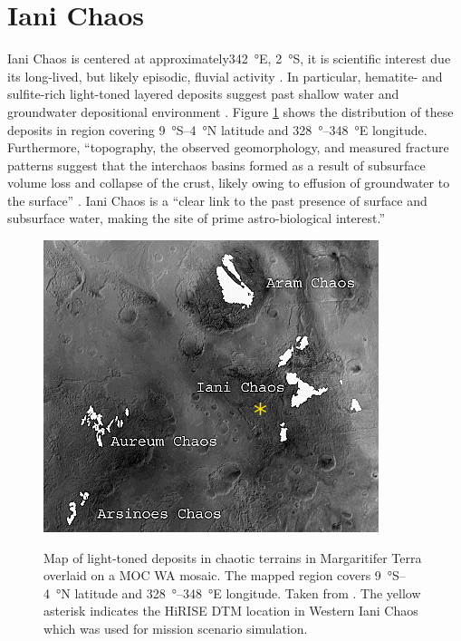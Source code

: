 \section{Iani Chaos}
\label{sec:MissionSites:IaniChaos}
Iani Chaos is centered at approximately\SI{342}{\degree}E, \SI{2}{\degree}S, it is scientific interest due its long-lived, but likely episodic, fluvial activity . In particular, hematite- and sulfite-rich light-toned layered deposits suggest past shallow water and groundwater depositional environment . Figure \ref{fig:mission-site-iani-chaos} shows the distribution of these deposits in region covering \SI{9}{\degree}S–\SI{4}{\degree}N latitude and \SI{328}{\degree}–\SI{348}{\degree}E longitude. Furthermore, ``topography, the observed geomorphology, and measured fracture patterns suggest that the interchaos basins formed as a result of subsurface volume loss and collapse of the crust, likely owing to effusion of groundwater to the surface'' . Iani Chaos is a ``clear link to the past presence of surface and subsurface water, making the site of prime astro-biological interest.'' 

\begin{figure}[h]
  \centering
  \hypersetup{linkcolor=captionTextColor}
  \includegraphics[width=0.5\linewidth]{sections/mission-sites/images/iani-chaos-deposits.png}\\
  \caption[Map of light‐toned deposits in chaotic terrains in Margaritifer Terra overlaid on a \ac{MOC} \ac{WA} mosaic]
          {Map of light‐toned deposits in chaotic terrains in Margaritifer Terra overlaid on a \ac{MOC} \ac{WA} mosaic. The mapped region covers \SI{9}{\degree}S–\SI{4}{\degree}N latitude and \SI{328}{\degree}–\SI{348}{\degree}E longitude. Taken from . The yellow asterisk indicates the \ac{HiRISE} \ac{DTM} location in Western Iani Chaos which was used for mission scenario simulation.}
  \label{fig:mission-site-iani-chaos}
\end{figure}

